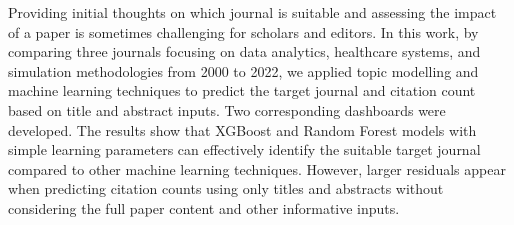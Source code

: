 \documentclass[9pt,twocolumn,twoside]{pnas-new}
\begin{document}
Providing initial thoughts on which journal is suitable and assessing the impact of a paper is sometimes challenging for scholars and editors. In this work, by comparing three journals focusing on data analytics, healthcare systems, and simulation methodologies from 2000 to 2022, we applied topic modelling and machine learning techniques to predict the target journal and citation count based on title and abstract inputs. Two corresponding dashboards were developed. The results show that XGBoost and Random Forest models with simple learning parameters can effectively identify the suitable target journal compared to other machine learning techniques. However, larger residuals appear when predicting citation counts using only titles and abstracts without considering the full paper content and other informative inputs.






\end{document}
